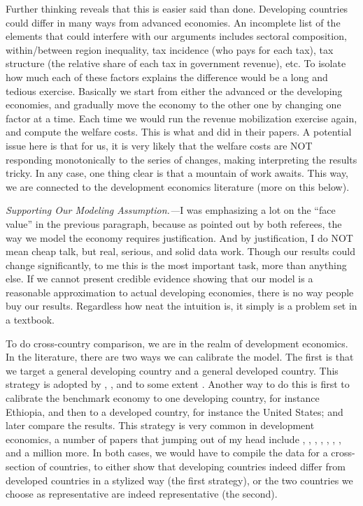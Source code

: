 \documentclass[twoside,11pt,leqno]{article}
\begin{document}
Further thinking reveals that this is easier said than done. Developing countries could differ in many ways from advanced economies. An incomplete list of the elements that could interfere with our arguments includes sectoral composition, within/between region inequality, tax incidence (who pays for each tax), tax structure (the relative share of each tax in government revenue), etc. To isolate how much each of these factors explains the difference would be a long and tedious exercise. Basically we start from either the advanced or the developing economies, and gradually move the economy to the other one by changing one factor at a time. Each time we would run the revenue mobilization exercise again, and compute the welfare costs. This is what \citet{Restucciaetal:2008} and \citet{Conesaetal:2009} did in their papers. A potential issue here is that for us, it is very likely that the welfare costs are NOT responding monotonically to the series of changes, making interpreting the results tricky. In any case, one thing clear is that a mountain of work awaits. This way, we are connected to the development economics literature (more on this below).

\textit{Supporting Our Modeling Assumption.---}I was emphasizing a lot on the ``face value'' in the previous paragraph, because as pointed out by both referees, the way we model the economy requires justification. And by justification, I do NOT mean cheap talk, but real, serious, and solid data work. Though our results could change significantly, to me this is the most important task, more than anything else. If we cannot present credible evidence showing that our model is a reasonable approximation to actual developing economies, there is no way people buy our results. Regardless how neat the intuition is, it simply is a problem set in a textbook.

To do cross-country comparison, we are in the realm of development economics. In the literature, there are two ways we can calibrate the model. The first is that we target a general developing country and a general developed country. This strategy is adopted by \citet{Caselli:2005}, \citet{Restucciaetal:2008}, and to some extent \citet{AdamopoulosRestuccia:2014}. Another way to do this is first to calibrate the benchmark economy to one developing country, for instance Ethiopia, and then to a developed country, for instance the United States; and later compare the results. This strategy is very common in development economics, a number of papers that jumping out of my head include \citet{Bueraetal:2011}, \citet{BueraShin:2013}, \citet{Bueraetal:2013}, \citet{LagakosWaugh:2013}, \citet{Lagakos:2016}, \citet{Fengetal:2018}, \citet{ItskhokiMoll:2019}, and a million more. In both cases, we would have to compile the data for a cross-section of countries, to either show that developing countries indeed differ from developed countries in a stylized way (the first strategy), or the two countries we choose as representative are indeed representative (the second).
\end{document}
